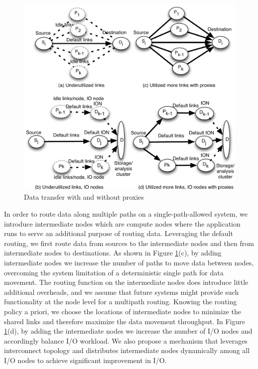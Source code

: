 \documentclass[final,5p,times]{elsarticle}
\begin{document}
\begin{figure}[!htb]
\vspace{-0.1in}
\centering
\includegraphics[scale=0.5]{figures/multiply}
\vspace{-0.2in}
\caption{Data transfer with and without proxies}
\vspace{-0.1in}
\label{fig:multiply}
\end{figure}

In order to route data along multiple paths on a single-path-allowed system, we introduce intermediate nodes which are compute nodes where the application runs to serve an additional purpose of routing data. Leveraging the default routing, we first route data from sources to the intermediate nodes and then from intermediate nodes to destinations. As shown in Figure \ref{fig:multiply}(c), by adding intermediate nodes we increase the number of paths to move data between nodes, overcoming the system limitation of a deterministic single path for data movement. The  routing function on the intermediate nodes does introduce little additional overheads, and we assume that future systems might provide such functionality at the node level for a multipath routing.  Knowing the routing policy a priori, we choose the locations of intermediate nodes to minimize the shared links and therefore maximize the data movement throughput. In Figure \ref{fig:multiply}(d), by adding the intermediate nodes we increase the number of I/O nodes and accordingly balance I/O workload. 
We also propose a mechanism that leverages interconnect topology and distributes intermediate nodes dynamically among all I/O nodes to achieve significant improvement in I/O. 
\end{document}
